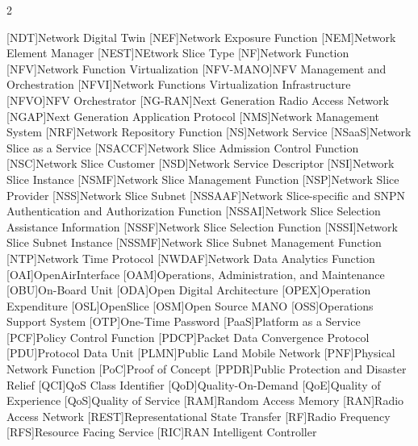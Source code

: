 \begin{multicols}{2}
\begin{acronym}[AAAAAAAAA]
	[NDT]{Network Digital Twin}
	[NEF]{Network Exposure Function}
	[NEM]{Network Element Manager}
	[NEST]{NEtwork Slice Type}
	[NF]{Network Function}
	[NFV]{Network Function Virtualization}
	[NFV-MANO]{\acs{NFV} Management and Orchestration}
	[NFVI]{Network Functions Virtualization Infrastructure}
	[NFVO]{\acs{NFV} Orchestrator}
	[NG-RAN]{Next Generation Radio Access Network} 
	[NGAP]{Next Generation Application Protocol}
	[NMS]{Network Management System}
	[NRF]{Network Repository Function}
	[NS]{Network Service}
    [NSaaS]{Network Slice as a Service}
	[NSACCF]{Network Slice Admission Control Function}
	[NSC]{Network Slice Customer}
	[NSD]{Network Service Descriptor}
	[NSI]{Network Slice Instance}
    [NSMF]{Network Slice Management Function}
	[NSP]{Network Slice Provider}
    [NSS]{Network Slice Subnet}
	[NSSAAF]{Network Slice-specific and \ac{SNPN} Authentication and Authorization Function}
	[NSSAI]{Network Slice Selection Assistance Information} 
	[NSSF]{Network Slice Selection Function}
    [NSSI]{Network Slice Subnet Instance}
    [NSSMF]{Network Slice Subnet Management Function}
    [NTP]{Network Time Protocol}
	[NWDAF]{Network Data Analytics Function}
	[OAI]{OpenAirInterface} 
	[OAM]{Operations, Administration, and Maintenance}
	[OBU]{On-Board Unit} 	
	[ODA]{Open Digital Architecture}
	[OPEX]{Operation Expenditure}
	[OSL]{OpenSlice}
	[OSM]{Open Source MANO}
	[OSS]{Operations Support System}
	[OTP]{One-Time Password}
	[PaaS]{Platform as a Service}
	[PCF]{Policy Control Function}
	[PDCP]{Packet Data Convergence Protocol}
	[PDU]{Protocol Data Unit}
	[PLMN]{Public Land Mobile Network}
	[PNF]{Physical Network Function}
	[PoC]{Proof of Concept}
	[PPDR]{Public Protection and Disaster Relief}
    [QCI]{\acs{QoS} Class Identifier}
	[QoD]{Quality-On-Demand}
	[QoE]{Quality of Experience}
	[QoS]{Quality of Service}
	[RAM]{Random Access Memory}
	[RAN]{Radio Access Network}
	[REST]{Representational State Transfer} 
	[RF]{Radio Frequency}
	[RFS]{Resource Facing Service}
	[RIC]{RAN Intelligent Controller}

\end{acronym}
\end{multicols}
